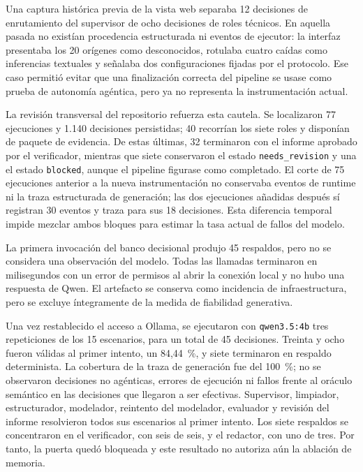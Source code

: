 Una captura histórica previa de la vista web separaba 12 decisiones de
enrutamiento del supervisor de ocho decisiones de roles técnicos. En aquella
pasada no existían procedencia estructurada ni eventos de ejecutor: la interfaz
presentaba los 20 orígenes como desconocidos, rotulaba cuatro caídas como
inferencias textuales y señalaba dos configuraciones fijadas por el protocolo.
Ese caso permitió evitar que una finalización correcta del pipeline se usase
como prueba de autonomía agéntica, pero ya no representa la instrumentación
actual.

La revisión transversal del repositorio refuerza esta cautela. Se localizaron
77 ejecuciones y 1.140 decisiones persistidas; 40 recorrían los siete roles y
disponían de paquete de evidencia. De estas últimas, 32 terminaron con el
informe aprobado por el verificador, mientras que siete conservaron el estado
\texttt{needs\_revision} y una el estado \texttt{blocked}, aunque el pipeline
figurase como completado. El corte de 75 ejecuciones anterior a la nueva
instrumentación no conservaba eventos de runtime ni la traza estructurada de
generación; las dos ejecuciones añadidas después sí registran 30 eventos y
traza para sus 18 decisiones. Esta diferencia temporal impide mezclar ambos
bloques para estimar la tasa actual de fallos del modelo.

La primera invocación del banco decisional produjo 45 respaldos, pero no se
considera una observación del modelo. Todas las llamadas terminaron en
milisegundos con un error de permisos al abrir la conexión local y no hubo una
respuesta de Qwen. El artefacto se conserva como incidencia de infraestructura,
pero se excluye íntegramente de la medida de fiabilidad generativa.

Una vez restablecido el acceso a Ollama, se ejecutaron con
\texttt{qwen3.5:4b} tres repeticiones de los 15 escenarios, para un total de 45
decisiones. Treinta y ocho fueron válidas al primer intento, un 84,44~\%, y
siete terminaron en respaldo determinista. La cobertura de la traza de
generación fue del 100~\%; no se observaron decisiones no agénticas, errores de
ejecución ni fallos frente al oráculo semántico en las decisiones que llegaron
a ser efectivas. Supervisor, limpiador, estructurador, modelador, reintento del
modelador, evaluador y revisión del informe resolvieron todos sus escenarios al
primer intento. Los siete respaldos se concentraron en el verificador, con seis
de seis, y el redactor, con uno de tres. Por tanto, la puerta quedó bloqueada y
este resultado no autoriza aún la ablación de memoria.

